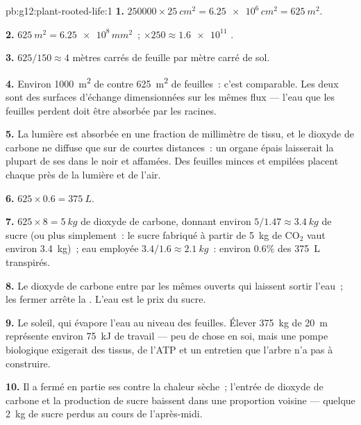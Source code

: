 \begin{solution}{pb:g12:plant-rooted-life:1}
\textbf{1.} $\num{250000} \times \qty{25}{cm^2} = \num{6.25e6}\,
\unit{cm^2} = \qty{625}{m^2}$.

\textbf{2.} $\qty{625}{m^2} = \num{6.25e8}\,\unit{mm^2}$~; $\times 250
\approx \num{1.6e11}$ .

\textbf{3.} $625/150 \approx 4$ mètres carrés de feuille par mètre
carré de sol.

\textbf{4.} Environ \qty{1000}{m^2} de  contre
\qty{625}{m^2} de feuilles~: c'est comparable. Les deux sont des
surfaces d'échange dimensionnées sur les mêmes flux --- l'eau que les
feuilles perdent doit être absorbée par les racines.

\textbf{5.} La lumière est absorbée en une fraction de millimètre de
tissu, et le dioxyde de carbone ne diffuse que sur de courtes
distances~: un organe épais laisserait la plupart de ses  dans
le noir et affamées. Des feuilles minces et empilées placent chaque
 près de la lumière et de l'air.

\textbf{6.} $625 \times 0.6 = \qty{375}{L}$.

\textbf{7.} $625 \times 8 = \qty{5}{kg}$ de dioxyde de carbone,
donnant environ $5/1.47 \approx \qty{3.4}{kg}$ de sucre (ou plus
simplement~: le sucre fabriqué à partir de \qty{5}{kg} de
$\mathrm{CO_2}$ vaut environ \qty{3.4}{kg})~; eau employée
$3.4/1.6 \approx \qty{2.1}{kg}$~: environ 0.6\% des \qty{375}{L}
transpirés.

\textbf{8.} Le dioxyde de carbone entre par les mêmes  ouverts
qui laissent sortir l'eau~; les fermer arrête la . L'eau
est le prix du sucre.

\textbf{9.} Le soleil, qui évapore l'eau au niveau des feuilles.
Élever \qty{375}{kg} de \qty{20}{m} représente environ \qty{75}{kJ} de
travail --- peu de chose en soi, mais une pompe biologique exigerait
des tissus, de l'ATP et un entretien que l'arbre n'a pas à construire.

\textbf{10.} Il a fermé en partie ses  contre la chaleur
sèche~; l'entrée de dioxyde de carbone et la production de sucre
baissent dans une proportion voisine --- quelque \qty{2}{kg} de sucre
perdus au cours de l'après-midi.


\end{solution}
